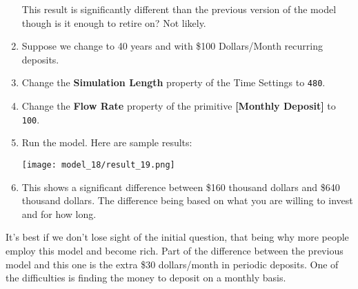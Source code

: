\documentclass[]{memoir}
\makeatletter
\def\maxwidth{\ifdim\Gin@nat@width>\linewidth\linewidth
\else\Gin@nat@width\fi}
\let\Oldincludegraphics\includegraphics
\renewcommand{\includegraphics}[1]{\Oldincludegraphics[width=\maxwidth]{#1}}
\newcommand{\p}[1]{\textbf{{[}#1{]}}}
\newcommand{\e}[1]{\texttt{#1}}
\renewcommand{\a}[1]{\textbf{#1}}
\makeatother
\begin{document}
\begin{oframed}
\begin{enumerate}
This result is significantly different than the previous version of the model though is it enough to retire on? Not likely.


\item 

Suppose we change to 40 years and with \$100 Dollars/Month recurring deposits.


\item  Change the \a{Simulation Length} property of the Time Settings to \e{480}.
\item  Change the \a{Flow Rate} property of the primitive \p{Monthly Deposit} to \e{100}.
\item Run the model. Here are sample results:\par \begin{minipage}{\linewidth}  \centering \texttt{[image: model\_18/result\_19.png]}
\end{minipage}
\item 

This shows a significant difference between \$160 thousand dollars and \$640 thousand dollars. The difference being based on what you are willing to invest and for how long.



\end{enumerate} \end{oframed}

It's best if we don't lose sight of the initial question, that being why
more people employ this model and become rich. Part of the difference
between the previous model and this one is the extra \$30 dollars/month
in periodic deposits. One of the difficulties is finding the money to
deposit on a monthly basis.

\FloatBarrier 
\end{document}
